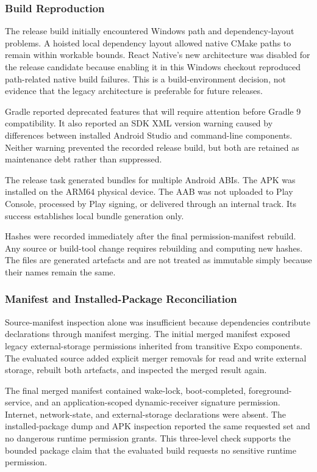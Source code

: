 \subsubsection{Build Reproduction}

The release build initially encountered Windows path and dependency-layout problems. A hoisted local dependency layout allowed native CMake paths to remain within workable bounds. React Native's new architecture was disabled for the release candidate because enabling it in this Windows checkout reproduced path-related native build failures. This is a build-environment decision, not evidence that the legacy architecture is preferable for future releases.

Gradle reported deprecated features that will require attention before Gradle 9 compatibility. It also reported an SDK XML version warning caused by differences between installed Android Studio and command-line components. Neither warning prevented the recorded release build, but both are retained as maintenance debt rather than suppressed.

The release task generated bundles for multiple Android ABIs. The APK was installed on the ARM64 physical device. The AAB was not uploaded to Play Console, processed by Play signing, or delivered through an internal track. Its success establishes local bundle generation only.

Hashes were recorded immediately after the final permission-manifest rebuild. Any source or build-tool change requires rebuilding and computing new hashes. The files are generated artefacts and are not treated as immutable simply because their names remain the same.

\subsubsection{Manifest and Installed-Package Reconciliation}

Source-manifest inspection alone was insufficient because dependencies contribute declarations through manifest merging. The initial merged manifest exposed legacy external-storage permissions inherited from transitive Expo components. The evaluated source added explicit merger removals for read and write external storage, rebuilt both artefacts, and inspected the merged result again.

The final merged manifest contained wake-lock, boot-completed, foreground-service, and an application-scoped dynamic-receiver signature permission. Internet, network-state, and external-storage declarations were absent. The installed-package dump and APK inspection reported the same requested set and no dangerous runtime permission grants. This three-level check supports the bounded package claim that the evaluated build requests no sensitive runtime permission.

